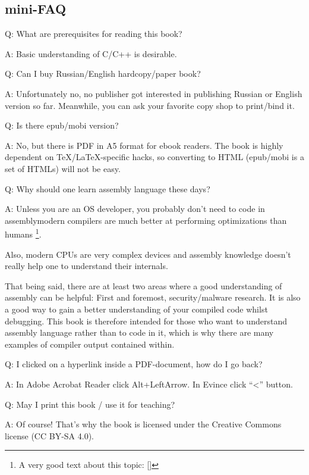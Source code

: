 \subsection*{mini-FAQ}

\par Q: What are prerequisites for reading this book?
\par A: Basic understanding of C/C++ is desirable.

\par Q: Can I buy Russian/English hardcopy/paper book?
\par A: Unfortunately no, no publisher got interested in publishing Russian or English version so far.
Meanwhile, you can ask your favorite copy shop to print/bind it.

\par Q: Is there epub/mobi version?
\par A: No, but there is PDF in A5 format for ebook readers.
The book is highly dependent on TeX/LaTeX-specific hacks, so converting to HTML (epub/mobi is a set of HTMLs)
will not be easy.

\par Q: Why should one learn assembly language these days?
\par A: Unless you are an \ac{OS} developer, you probably don't need to code in assembly\textemdash{}modern compilers 
are much better at performing optimizations than humans \footnote{A very good text about this topic: [\AgnerFog]}.

Also, modern \ac{CPU}s are very complex devices and assembly knowledge doesn't really help one to understand their internals.

That being said, there are at least two areas where a good understanding of assembly can be helpful: 
First and foremost, security/malware research. It is also a good way to gain a better understanding of your compiled code whilst debugging.
This book is therefore intended for those who want to understand assembly language rather 
than to code in it, which is why there are many examples of compiler output contained within.

\par Q: I clicked on a hyperlink inside a PDF-document, how do I go back?
\par A: In Adobe Acrobat Reader click Alt+LeftArrow. In Evince click ``<'' button.

\par Q: May I print this book / use it for teaching?
\par A: Of course! That's why the book is licensed under the Creative Commons license (CC BY-SA 4.0).

